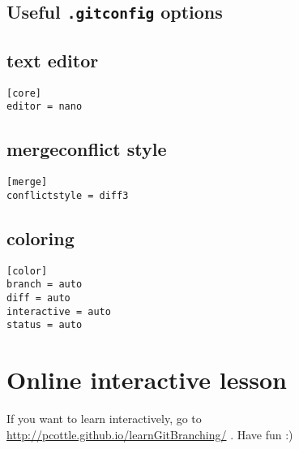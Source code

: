 \documentclass[12pt]{article}
\begin{document}
\subsection{Useful \texttt{.gitconfig} options}


\subsection{text editor}

\texttt{[core]\\
editor = nano }

\subsection{mergeconflict style}
\texttt{[merge]\\
conflictstyle = diff3 }

\subsection{coloring}
\texttt{[color]\\
  branch = auto\\
  diff = auto\\
  interactive = auto\\
  status = auto }

\section{Online interactive lesson}
If you want to learn interactively, go to \url{http://pcottle.github.io/learnGitBranching/} . Have fun :)
\end{document}
